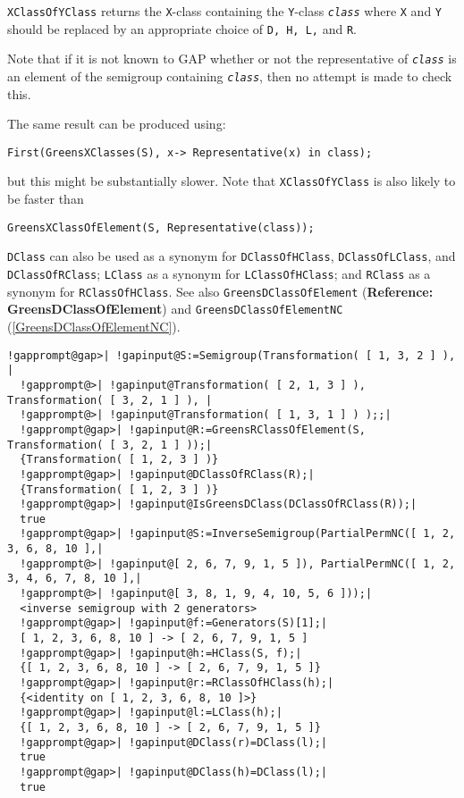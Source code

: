 \documentclass[a4paper,11pt]{report}
\begin{document}
{{{ \texttt{XClassOfYClass} returns the \texttt{X}-class containing the \texttt{Y}-class \mbox{\texttt{\mdseries\slshape class}} where \texttt{X} and \texttt{Y} should be replaced by an appropriate choice of \texttt{D, H, L,} and \texttt{R}.

 Note that if it is not known to \textsf{GAP} whether or not the representative of \mbox{\texttt{\mdseries\slshape class}} is an element of the semigroup containing \mbox{\texttt{\mdseries\slshape class}}, then no attempt is made to check this.

 The same result can be produced using: 
\begin{Verbatim}[commandchars=!@|,fontsize=\small,frame=single,label=Example]
  First(GreensXClasses(S), x-> Representative(x) in class);
\end{Verbatim}
 but this might be substantially slower. Note that \texttt{XClassOfYClass} is also likely to be faster than 
\begin{Verbatim}[commandchars=!@|,fontsize=\small,frame=single,label=Example]
  GreensXClassOfElement(S, Representative(class));
\end{Verbatim}
 

 \texttt{DClass} can also be used as a synonym for \texttt{DClassOfHClass}, \texttt{DClassOfLClass}, and \texttt{DClassOfRClass}; \texttt{LClass} as a synonym for \texttt{LClassOfHClass}; and \texttt{RClass} as a synonym for \texttt{RClassOfHClass}. See also \texttt{GreensDClassOfElement} (\textbf{Reference: GreensDClassOfElement}) and \texttt{GreensDClassOfElementNC} (\ref{GreensDClassOfElementNC}). 
\begin{Verbatim}[commandchars=!@|,fontsize=\small,frame=single,label=Example]
  !gapprompt@gap>| !gapinput@S:=Semigroup(Transformation( [ 1, 3, 2 ] ), |
  !gapprompt@>| !gapinput@Transformation( [ 2, 1, 3 ] ), Transformation( [ 3, 2, 1 ] ), |
  !gapprompt@>| !gapinput@Transformation( [ 1, 3, 1 ] ) );;|
  !gapprompt@gap>| !gapinput@R:=GreensRClassOfElement(S, Transformation( [ 3, 2, 1 ] ));|
  {Transformation( [ 1, 2, 3 ] )}
  !gapprompt@gap>| !gapinput@DClassOfRClass(R);|
  {Transformation( [ 1, 2, 3 ] )}
  !gapprompt@gap>| !gapinput@IsGreensDClass(DClassOfRClass(R));|
  true
  !gapprompt@gap>| !gapinput@S:=InverseSemigroup(PartialPermNC([ 1, 2, 3, 6, 8, 10 ],|
  !gapprompt@>| !gapinput@[ 2, 6, 7, 9, 1, 5 ]), PartialPermNC([ 1, 2, 3, 4, 6, 7, 8, 10 ],|
  !gapprompt@>| !gapinput@[ 3, 8, 1, 9, 4, 10, 5, 6 ]));|
  <inverse semigroup with 2 generators>
  !gapprompt@gap>| !gapinput@f:=Generators(S)[1];|
  [ 1, 2, 3, 6, 8, 10 ] -> [ 2, 6, 7, 9, 1, 5 ]
  !gapprompt@gap>| !gapinput@h:=HClass(S, f);|
  {[ 1, 2, 3, 6, 8, 10 ] -> [ 2, 6, 7, 9, 1, 5 ]}
  !gapprompt@gap>| !gapinput@r:=RClassOfHClass(h);|
  {<identity on [ 1, 2, 3, 6, 8, 10 ]>}
  !gapprompt@gap>| !gapinput@l:=LClass(h);|
  {[ 1, 2, 3, 6, 8, 10 ] -> [ 2, 6, 7, 9, 1, 5 ]}
  !gapprompt@gap>| !gapinput@DClass(r)=DClass(l);|
  true
  !gapprompt@gap>| !gapinput@DClass(h)=DClass(l);|
  true
\end{Verbatim}
 }

}}
\end{document}
